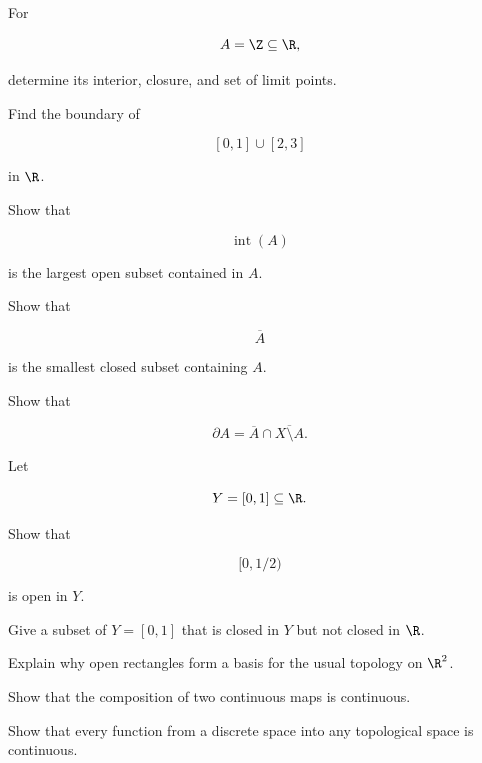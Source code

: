 \begin{exercise}[2]
For

\[
A=\Z\subseteq\R,
\]

determine its interior, closure, and set of limit points.
\end{exercise}

\begin{exercise}[2]
Find the boundary of

\[
[0,1]\cup[2,3]
\]

in \(\R\).
\end{exercise}

\begin{exercise}[2]
Show that

\[
\operatorname{int}(A)
\]

is the largest open subset contained in \(A\).
\end{exercise}

\begin{exercise}[2]
Show that

\[
\overline{A}
\]

is the smallest closed subset containing \(A\).
\end{exercise}

\begin{exercise}[2]
Show that

\[
\partial A
=
\overline{A}\cap\overline{X\setminus A}.
\]
\end{exercise}

\begin{exercise}[2]
Let

\[
Y=[0,1]\subseteq\R.
\]

Show that

\[
[0,1/2)
\]

is open in \(Y\).
\end{exercise}

\begin{exercise}[2]
Give a subset of \(Y=[0,1]\) that is closed in \(Y\) but not closed in
\(\R\).
\end{exercise}

\begin{exercise}[2]
Explain why open rectangles form a basis for the usual topology on
\(\R^2\).
\end{exercise}

\begin{exercise}[2]
Show that the composition of two continuous maps is continuous.
\end{exercise}

\begin{exercise}[2]
Show that every function from a discrete space into any topological space is
continuous.
\end{exercise}

